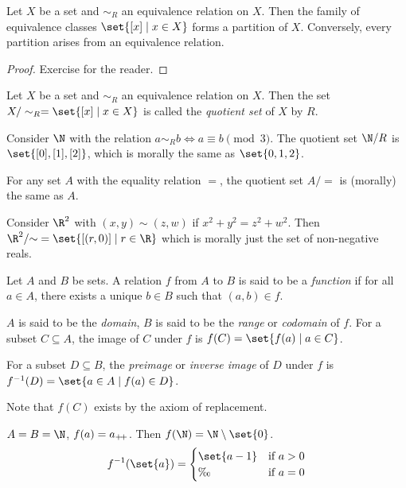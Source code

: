 \begin{proposition*}
\label{thm:fter}
    Let $X$ be a set and $\sim_R$ an equivalence relation on $X$.
    Then the family of equivalence classes $\set{[x] \mid x \in X}$ forms
    a partition of $X$.
    Conversely, every partition arises from an equivalence relation.
\end{proposition*}
\begin{proof}
    Exercise for the reader.
\end{proof}

\begin{definition}
    Let $X$ be a set and $\sim_R$ an equivalence relation on $X$.
    Then the set $X / \sim_R = \set{[x] \mid x \in X}$ is called the
    \emph{quotient set} of $X$ by $R$.
\end{definition}
\begin{examples}
    \item Consider $\N$ with the relation $a \sim_R b \iff a \equiv b \pmod{3}$.
    The quotient set $\N / R$ is $\set{[0], [1], [2]}$, which is morally the
    same as $\set{0, 1, 2}$.
    \item For any set $A$ with the equality relation $=$, the quotient set
    $A /{=}$ is (morally) the same as $A$.
    \item Consider $\R^2$ with $(x, y) \sim (z, w)$ if $x^2 + y^2 = z^2 + w^2$.
    Then $\R^2 /{\sim} = \set{[(r, 0)] \mid r \in \R}$ which is morally just
    the set of non-negative reals.
\end{examples}

\begin{definition*}[Function] \label{def:fn}
    Let $A$ and $B$ be sets.
    A relation $f$ from $A$ to $B$ is said to be a \emph{function} if for
    all $a \in A$, there exists a unique $b \in B$ such that $(a, b) \in f$.

    $A$ is said to be the \emph{domain}, $B$ is said to be the \emph{range}
    or \emph{codomain} of $f$.
    For a subset $C \subseteq A$, the image of $C$ under $f$ is
    $f(C) = \set{f(a) \mid a \in C}$.

    For a subset $D \subseteq B$, the \emph{preimage} or \emph{inverse image} of
    $D$ under $f$ is $f^{-1}(D) = \set{a \in A \mid f(a) \in D}$.
\end{definition*}
Note that $f(C)$ exists by the axiom of replacement.
\begin{examples}
    \item $A = B = \N$, $f(a) = a_{+\!+}$.
    Then $f(\N) = \N \setminus \set{0}$. \[
        f^{-1}(\set{a}) = \begin{cases}
            \set{a - 1} & \text{if } a > 0 \\
            \O & \text{if } a = 0
        \end{cases}
    \]
\end{examples}

